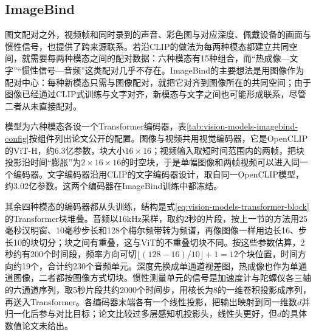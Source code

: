 \subsection{ImageBind}
\label{sec:vision-models-imagebind}

图文配对之外，视频帧和同时录到的声音、彩色图与对应深度、佩戴设备的画面与惯性信号，也提供了跨来源联系。若沿CLIP的做法为每两种模态都建立共同空间，就需要每两种模态之间的配对数据：六种模态有15种组合，而“热成像—文字”“惯性信号—音频”这类配对几乎不存在。ImageBind的主要想法是用图像作为配对中心：每种新模态只需与图像配对，就把它对齐到图像所在的共同空间；由于图像已经通过CLIP式训练与文字对齐，新模态与文字之间也可能形成联系，尽管二者从未直接配对。

模型为六种模态各设一个Transformer编码器，表\ref{tab:vision-models-imagebind-config}按组件列出论文公开的配置。图像与视频共用视觉编码器，它是OpenCLIP的ViT-H，约6.3亿参数，块大小$16\times16$；视频输入取短时间范围内的两帧，把块投影沿时间“膨胀”为$2\times16\times16$的时空块，于是单幅图像和两帧视频可以进入同一个编码器。文字编码器沿用CLIP的文字编码器设计，取自同一OpenCLIP模型，约3.02亿参数。这两个编码器在ImageBind训练中都冻结。

其余四种模态的编码器都从头训练，结构是式\eqref{eq:vision-models-transformer-block}的Transformer块堆叠。音频以16kHz采样，取约2秒的片段，按上一节的方法用25毫秒汉明窗、10毫秒步长和128个梅尔频带转为频谱，再像图像一样用边长16、步长10的块切分；块之间有重叠，这与ViT的不重叠切块不同。按这些参数估算，2秒约有200个时间段，频率方向可切$\lfloor(128-16)/10\rfloor+1=12$个块位置，时间方向约19个，合计约230个音频单元。深度先换成单通道视差图，热成像也作为单通道图像，二者都按图像方式切块。惯性测量单元的信号是加速度计与陀螺仪各三轴的六通道序列，取5秒片段共约2000个时间步，用核长为8的一维卷积投影成序列，再送入Transformer。各编码器末端各有一个线性投影，把输出映射到同一维数$d$并归一化后参与对比目标；论文比较过多层感知机投影头，线性头更好，但$d$的具体数值论文未给出。

